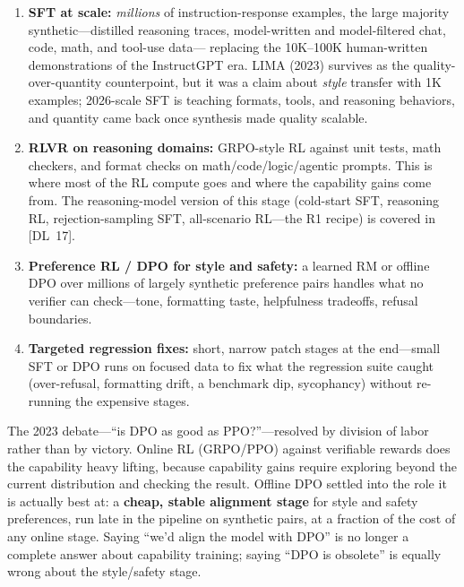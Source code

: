 \begin{enumerate}[leftmargin=*]
\item \textbf{SFT at scale:} \emph{millions} of instruction-response
  examples, the large majority synthetic---distilled reasoning traces,
  model-written and model-filtered chat, code, math, and tool-use data---%
  replacing the 10K--100K human-written demonstrations of the
  InstructGPT era.  LIMA (2023) survives as the quality-over-quantity
  counterpoint, but it was a claim about \emph{style} transfer with
  1K examples; 2026-scale SFT is teaching formats, tools, and reasoning
  behaviors, and quantity came back once synthesis made quality scalable.
\item \textbf{RLVR on reasoning domains:} GRPO-style RL against unit
  tests, math checkers, and format checks on math/code/logic/agentic
  prompts.  This is where most of the RL compute goes and where the
  capability gains come from.  The reasoning-model version of this stage
  (cold-start SFT, reasoning RL, rejection-sampling SFT, all-scenario
  RL---the R1 recipe) is covered in [DL~17].
\item \textbf{Preference RL / DPO for style and safety:} a learned RM or
  offline DPO over millions of largely synthetic preference pairs handles
  what no verifier can check---tone, formatting taste, helpfulness
  tradeoffs, refusal boundaries.
\item \textbf{Targeted regression fixes:} short, narrow patch stages at
  the end---small SFT or DPO runs on focused data to fix what the
  regression suite caught (over-refusal, formatting drift, a benchmark
  dip, sycophancy) without re-running the expensive stages.
\end{enumerate}

\begin{keyinsight}
The 2023 debate---``is DPO as good as PPO?''---resolved by division of
labor rather than by victory.  Online RL (GRPO/PPO) against verifiable
rewards does the capability heavy lifting, because capability gains
require exploring beyond the current distribution and checking the
result.  Offline DPO settled into the role it is actually best at: a
\textbf{cheap, stable alignment stage} for style and safety preferences,
run late in the pipeline on synthetic pairs, at a fraction of the cost of
any online stage.  Saying ``we'd align the model with DPO'' is no longer
a complete answer about capability training; saying ``DPO is obsolete''
is equally wrong about the style/safety stage.
\end{keyinsight}

